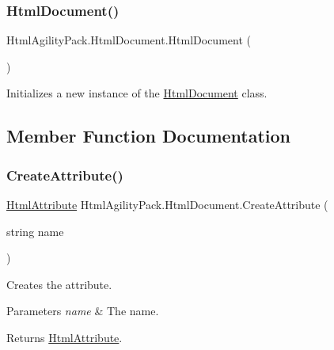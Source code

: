 \subsubsection{\texorpdfstring{Html\+Document()}{HtmlDocument()}}
{\footnotesize\ttfamily Html\+Agility\+Pack.\+Html\+Document.\+Html\+Document (\begin{DoxyParamCaption}{ }\end{DoxyParamCaption})\hspace{0.3cm}{\ttfamily [inline]}}



Initializes a new instance of the \hyperlink{class_html_agility_pack_1_1_html_document}{Html\+Document} class. 



\subsection{Member Function Documentation}
\mbox{\label{class_html_agility_pack_1_1_html_document_ab450c29d85b24ff097fab30efac72bc4}} 
\subsubsection{\texorpdfstring{Create\+Attribute()}{CreateAttribute()}\hspace{0.1cm}{\footnotesize\ttfamily [1/2]}}
{\footnotesize\ttfamily \hyperlink{class_html_agility_pack_1_1_html_attribute}{Html\+Attribute} Html\+Agility\+Pack.\+Html\+Document.\+Create\+Attribute (\begin{DoxyParamCaption}\item[{string}]{name }\end{DoxyParamCaption})\hspace{0.3cm}{\ttfamily [inline]}}



Creates the attribute. 


\begin{DoxyParams}{Parameters}
{\em name} & The name.\\
\hline
\end{DoxyParams}
\begin{DoxyReturn}{Returns}
\hyperlink{class_html_agility_pack_1_1_html_attribute}{Html\+Attribute}.
\end{DoxyReturn}

